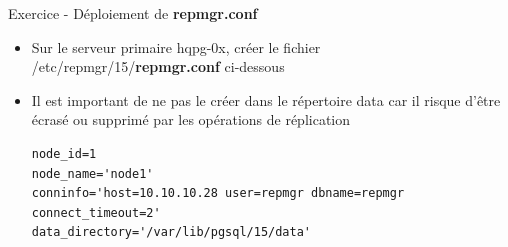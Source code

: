 
\begin{frame}[fragile]{Exercice - Déploiement de \textbf{repmgr.conf}}

   \begin{itemize}
      \item Sur le serveur primaire hqpg-0x, créer le fichier /etc/repmgr/15/\textbf{repmgr.conf} ci-dessous
      \item Il est important de ne pas le créer dans le répertoire data car il risque d'être écrasé ou supprimé par les opérations de réplication
\begin{tiny}
\begin{Verbatim}[commandchars=\\\{\}]
node_id=1
node_name='node1'
conninfo='host=10.10.10.28 user=repmgr dbname=repmgr connect_timeout=2'
data_directory='/var/lib/pgsql/15/data'
\end{Verbatim}
\end{tiny}
   \end{itemize}

\begin{toile}
\end{toile}

\end{frame}


